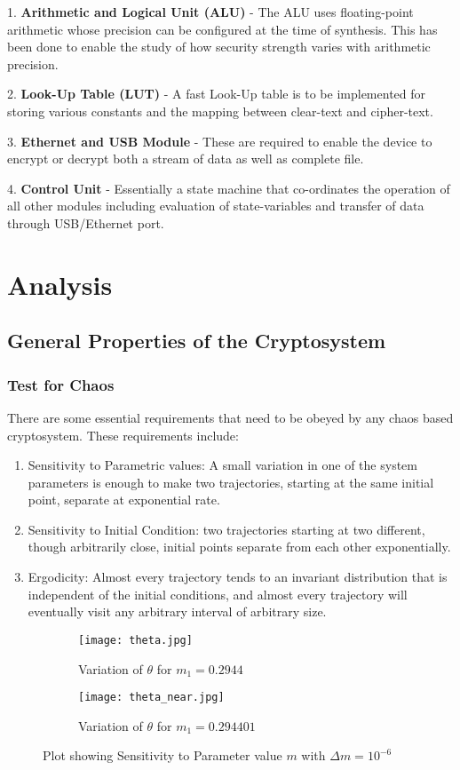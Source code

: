1. {\bf Arithmetic and Logical Unit (ALU)} - The ALU uses floating-point arithmetic whose precision can be configured at the time of synthesis. This has been done to enable the study of how security strength varies with arithmetic precision.

2. {\bf Look-Up Table (LUT)} - A fast Look-Up table is to be implemented for storing various constants and the mapping between clear-text and cipher-text.

3. {\bf Ethernet and USB Module} - These are required to enable the device to encrypt or decrypt both a stream of data as well as complete file.

4. {\bf Control Unit} - Essentially a state machine that co-ordinates the operation of all other modules including evaluation of state-variables and transfer of data through USB/Ethernet port.

\section{Analysis}
\subsection{General Properties of the Cryptosystem}
\subsubsection{Test for Chaos}
There are some essential requirements that need to be obeyed by any chaos based cryptosystem. These requirements include:
\begin{enumerate}
	\item Sensitivity to Parametric values: A small variation in one of the system parameters is enough to make two trajectories, starting at the same initial point, separate at exponential rate.
	\item Sensitivity to Initial  Condition:  two  trajectories  starting  at  two  different,  though  arbitrarily  close,  initial points separate from each other exponentially.
	\item Ergodicity:  Almost every trajectory tends to an invariant distribution that is independent of the initial conditions, and almost every trajectory will eventually visit any arbitrary interval of arbitrary size.
\end{enumerate}

\begin{figure}[H]
\begin{subfigure}{0.5\textwidth}
\texttt{[image: theta.jpg]}
\caption{Variation of ${\theta}$ for ${m_{1}=0.2944}$}\label{fig:theta_comp}
\end{subfigure}
\begin{subfigure}{0.5\textwidth}
\texttt{[image: theta\_near.jpg]}
\caption{Variation of ${\theta}$ for ${m_{1}=0.294401}$}\label{fig:trajectory_near_comp}
\end{subfigure}
\caption{Plot showing Sensitivity to Parameter value ${m}$ with ${\Delta m = 10^{-6}}$}\label{fig:image6}
\end{figure}

